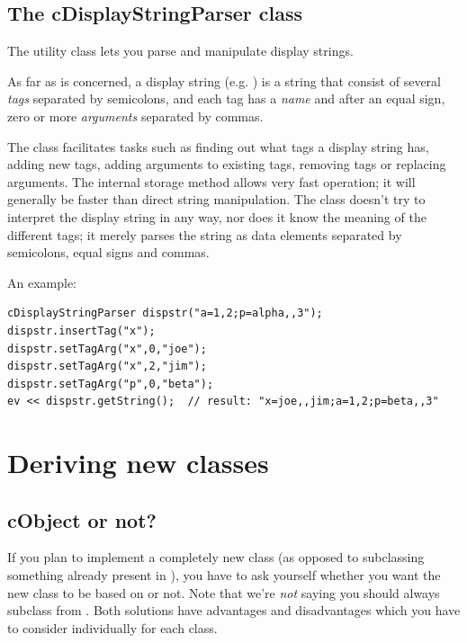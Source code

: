 \subsection{The cDisplayStringParser class}

The  utility class lets you parse and
manipulate display strings.

As far as  is concerned, a display string
(e.g. ) is a string that consist of several
\textit{tags} separated by semicolons, and each tag has a \textit{name}
and after an equal sign, zero or more \textit{arguments} separated by commas.

The class facilitates tasks such as finding out what tags a display string
has, adding new tags, adding arguments to existing tags,
removing tags or replacing arguments. The internal storage method allows
very fast operation; it will generally be faster than direct string manipulation.
The class doesn't try to interpret the display string in any way, nor does
it know the meaning of the different tags; it merely parses the string
as data elements separated by semicolons, equal signs and commas.

An example:

\begin{Verbatim}
cDisplayStringParser dispstr("a=1,2;p=alpha,,3");
dispstr.insertTag("x");
dispstr.setTagArg("x",0,"joe");
dispstr.setTagArg("x",2,"jim");
dispstr.setTagArg("p",0,"beta");
ev << dispstr.getString();  // result: "x=joe,,jim;a=1,2;p=beta,,3"
\end{Verbatim}





\section{Deriving new classes}
\label{sec:ch-sim-lib:deriving-new-classes}

\subsection{cObject or not?}

If you plan to implement a completely new class (as opposed to
subclassing something already present in {\opp}), you have
to ask yourself whether you want the new class to be based
on  or not.
Note that we're \textit{not} saying you should always
subclass from .
Both solutions have advantages and disadvantages which you
have to consider individually for each class.


